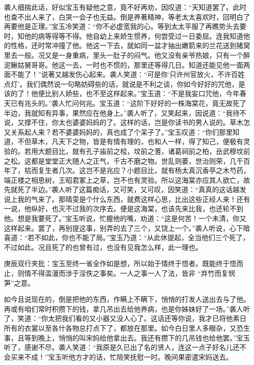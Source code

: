 \begin{parag}


    袭人细揣此话，好似宝玉有疑他之意，竟不好再劝，因叹道：“天知道罢了。此时也查不出人来了，白哭一会子也无益。倒是养著精神，等老太太喜欢时，回明白了再要他是正理。”宝玉冷笑道：“你不必虚宽我的心。等到太太平服了再瞧势头去要时，知他的病等得等不得。他自幼上来娇生惯养，何尝受过一日委屈。连我知道他的性格，还时常冲撞了他。他这一下去，就如同一盆才抽出嫩箭来的兰花送到猪窝里去一般。况又是一身重病，里头一肚子的闷气。他又没有亲爷热娘，只有一个醉泥鳅姑舅哥哥。他这一去，一时也不惯的，那里还等得几日。知道还能见他一面两面不能了！”说著又越发伤心起来。袭人笑道：“可是你‘只许州官放火，不许百姓点灯’。我们偶然说一句略妨碍些的话，就说是不利之谈，你如今好好的咒他，是该的了！他便比别人娇些，也不至这样起来。”宝玉道：“不是我妄口咒他，今年春天已有兆头的。”袭人忙问何兆。宝玉道：“这阶下好好的一株海棠花，竟无故死了半边，我就知有异事，果然应在他身上。”袭人听了，又笑起来，因说道：“我待不说，又撑不住，你太也婆婆妈妈的了。这样的话，岂是你读书的男人说的。草木怎又关系起人来？若不婆婆妈妈的，真也成了个呆子了。”宝玉叹道：“你们那里知道，不但草木，凡天下之物，皆是有情有理的，也和人一样，得了知己，便极有灵验的。若用大题目比，就有孔子庙前之桧，坟前之蓍，诸葛祠前之柏，岳武穆坟前之松。这都是堂堂正大随人之正气，千古不磨之物。世乱则萎，世治则荣，几千百年了，枯而复生者几次。这岂不是兆应？小题目比，就有杨太真沉香亭之木芍药，端正楼之相思树，王昭君冢上之草，岂不也有灵验。所以这海棠亦应其人欲亡，故先就死了半边。”袭人听了这篇痴话，又可笑，又可叹，因笑道：“真真的这话越发说上我的气来了。那晴雯是个什么东西，就费这样心思，比出这些正经人来！还有一说，他纵好，也灭不过我的次序去。便是这海棠，也该先来比我，也还轮不到他。想是我要死了。”宝玉听说，忙握他的嘴，劝道：“这是何苦！一个未清，你又这样起来。罢了，再别提这事，别弄的去了三个，又饶上一个。”袭人听说，心下暗喜道：“若不如此，你也不能了局。”宝玉乃道：“从此休提起，全当他们三个死了，不过如此。况且死了的也曾有过，也没有见我怎么样，此一理也。\begin{note}庚辰双行夹批：宝玉至终一省全作如是想，所以始于情终于悟者。既能终于悟而止，则情不得滥漫而涉于淫佚之事矣。一人之事一人了法，皆非 “弃竹而复悯笋”之意。\end{note}如今且说现在的，倒是把他的东西，作瞒上不瞒下，悄悄的打发人送出去与了他。再或有咱们常时积攒下的钱，拿几吊出去给他养病，也是你姊妹好了一场。”袭人听了，笑道：“你太把我们看的又小器又没人心了。这话还等你说，我才已将他素日所有的衣裳以至各什各物总打点下了，都放在那里。如今白日里人多眼杂，又恐生事，且等到晚上，悄悄的叫宋妈给他拿出去。我还有攒下的几吊钱也给他罢。”宝玉听了，感谢不尽。袭人笑道：“我原是久已出了名的贤人，连这一点子好名儿还不会买来不成！”宝玉听他方才的话，忙陪笑抚慰一时。晚间果密遣宋妈送去。
\end{parag}


